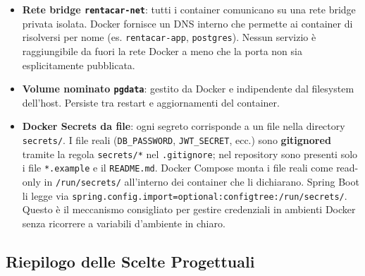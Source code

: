 \documentclass[12pt, a4paper]{article}
\begin{document}
    \begin{itemize}
        \item \textbf{Rete bridge \texttt{rentacar-net}}: tutti i container comunicano
        su una rete bridge privata isolata. Docker fornisce un DNS interno che permette ai
        container di risolversi per nome (es. \texttt{rentacar-app}, \texttt{postgres}).
        Nessun servizio è raggiungibile da fuori la rete Docker a meno che la porta non
        sia esplicitamente pubblicata.

        \item \textbf{Volume nominato \texttt{pgdata}}: gestito da Docker e indipendente
        dal filesystem dell'host. Persiste tra restart e aggiornamenti del container.

        \item \textbf{Docker Secrets da file}: ogni segreto corrisponde a un file nella
        directory \texttt{secrets/}. I file reali (\texttt{DB\_PASSWORD}, \texttt{JWT\_SECRET},
        ecc.) sono \textbf{gitignored} tramite la regola \texttt{secrets/*} nel
        \texttt{.gitignore}; nel repository sono presenti solo i file \texttt{*.example}
        e il \texttt{README.md}. Docker Compose monta i file reali come read-only in
        \texttt{/run/secrets/} all'interno dei container che li dichiarano. Spring Boot li
        legge via \texttt{spring.config.import=optional:configtree:/run/secrets/}.
        Questo è il meccanismo consigliato per gestire credenziali in
        ambienti Docker senza ricorrere a variabili d'ambiente in chiaro.
    \end{itemize}

    \subsection{Riepilogo delle Scelte Progettuali}
\end{document}
